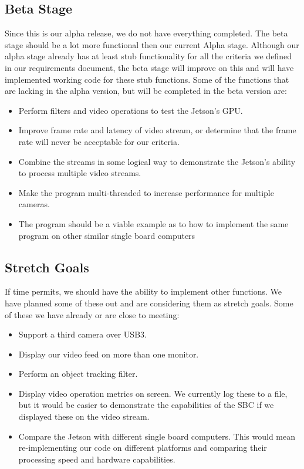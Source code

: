 \documentclass[letterpaper,10pt,titlepage]{IEEEtran}
\begin{document}
  \subsection{Beta Stage}
   Since this is our alpha release, we do not have everything completed. The beta stage should be a lot more functional then our current Alpha stage. Although our alpha stage already has at least stub functionality for all the criteria we defined in our requirements document, the beta stage will improve on this and will have implemented working code for these stub functions. Some of the functions that are lacking in the alpha version, but will be completed in the beta version are:\\
   	\begin{itemize}
		\item Perform filters and video operations to test the Jetson's GPU.
		\item Improve frame rate and latency of video stream, or determine that the frame rate will never be acceptable for our criteria.
		\item Combine the streams in some logical way to demonstrate the Jetson's ability to process multiple video streams.
		\item Make the program multi-threaded to increase performance for multiple cameras.
		\item The program should be a viable example as to how to implement the same program on other similar single board computers\\
	\end{itemize}
	
	\subsection{Stretch Goals}
	If time permits, we should have the ability to implement other functions. We have planned some of these out and are considering them as stretch goals. Some of these we have already or are close to meeting:\\
	\begin{itemize}
		\item Support a third camera over USB3.
		\item Display our video feed on more than one monitor.
		\item Perform an object tracking filter.
		\item Display video operation metrics on screen. We currently log these to a file, but it would be easier to demonstrate the capabilities of the SBC if we displayed these on the video stream.
		\item Compare the Jetson with different single board computers. This would mean re-implementing our code on different platforms and comparing their processing speed and hardware capabilities.\\
	\end{itemize}
	
\end{document}

